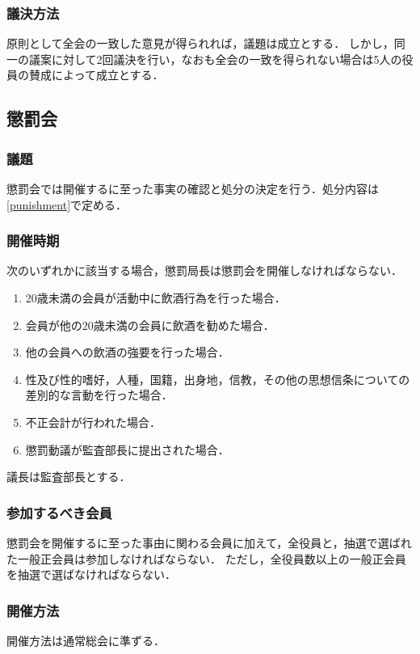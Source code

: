 \documentclass{ltjsarticle}
\begin{document}
      \subsubsection{議決方法}
        \jor
        原則として全会の一致した意見が得られれば，議題は成立とする．
        しかし，同一の議案に対して2回議決を行い，なおも全会の一致を得られない場合は5人の役員の賛成によって成立とする．
    \subsection{懲罰会}\label{pconf}
      \subsubsection{議題}
        \jor
        懲罰会では開催するに至った事実の確認と処分の決定を行う．処分内容は\ref{punishment}で定める．
      \subsubsection{開催時期}
        \jor
        次のいずれかに該当する場合，懲罰局長は懲罰会を開催しなければならない．
        \begin{enumerate}
          \item 20歳未満の会員が活動中に飲酒行為を行った場合．
          \item 会員が他の20歳未満の会員に飲酒を勧めた場合．
          \item 他の会員への飲酒の強要を行った場合．
          \item 性及び性的嗜好，人種，国籍，出身地，信教，その他の思想信条についての差別的な言動を行った場合．
          \item 不正会計が行われた場合．
          \item 懲罰動議が監査部長に提出された場合．
        \end{enumerate}
        議長は監査部長とする．
      \subsubsection{参加するべき会員}
        \jor
        懲罰会を開催するに至った事由に関わる会員に加えて，全役員と，抽選で選ばれた一般正会員は参加しなければならない．
        ただし，全役員数以上の一般正会員を抽選で選ばなければならない．
      \subsubsection{開催方法}
        \jor
        開催方法は通常総会に準ずる．
\end{document}
